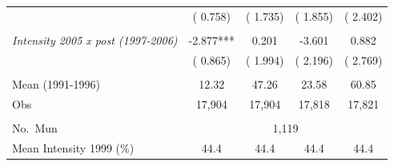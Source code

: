 \begin{tabular}{lcccc}
 & (       0.758) & (       1.735) & (       1.855) & (       2.402) \\ 
  & & & & \\ 
\textit{Intensity 2005 x post (1997-2006)} &       -2.877*** &        0.201 &       -3.601 &        0.882 \\ 
 & (       0.865) & (       1.994) & (       2.196) & (       2.769) \\ 
  & & & & \\ 
Mean (1991-1996) &        12.32 &        47.26 &        23.58 &        60.85 \\ 
Obs &       17,904 &       17,904 &       17,818 &       17,821 \\ 
  & & & & \\ 
No.\ Mun & \multicolumn{4}{c}{       1,119} \\ 
Mean Intensity 1999 (\%) &   44.4 &   44.4 &   44.4 &   44.4 \\ 
\bottomrule
\end{tabular}